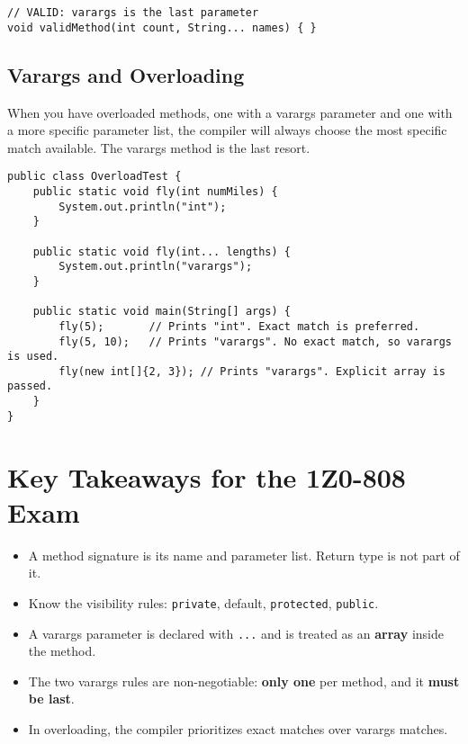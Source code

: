 \documentclass[12pt]{article}
\begin{document}
\begin{enumerate}[label=(\arabic*)]
\begin{enumerate}
\begin{verbatim}
// VALID: varargs is the last parameter
void validMethod(int count, String... names) { }
    \end{verbatim}
\end{enumerate}

\subsection{Varargs and Overloading}
When you have overloaded methods, one with a varargs parameter and one with a more specific parameter list, the compiler will always choose the most specific match available. The varargs method is the last resort.

\begin{verbatim}
public class OverloadTest {
    public static void fly(int numMiles) {
        System.out.println("int");
    }

    public static void fly(int... lengths) {
        System.out.println("varargs");
    }

    public static void main(String[] args) {
        fly(5);       // Prints "int". Exact match is preferred.
        fly(5, 10);   // Prints "varargs". No exact match, so varargs is used.
        fly(new int[]{2, 3}); // Prints "varargs". Explicit array is passed.
    }
}
\end{verbatim}

\section*{Key Takeaways for the 1Z0-808 Exam}
\begin{itemize}
    \item A method signature is its name and parameter list. Return type is not part of it.
    \item Know the visibility rules: \texttt{private}, default, \texttt{protected}, \texttt{public}.
    \item A varargs parameter is declared with \texttt{...} and is treated as an \textbf{array} inside the method.
    \item The two varargs rules are non-negotiable: \textbf{only one} per method, and it \textbf{must be last}.
    \item In overloading, the compiler prioritizes exact matches over varargs matches.
\end{itemize}
\end{enumerate}
\end{document}
